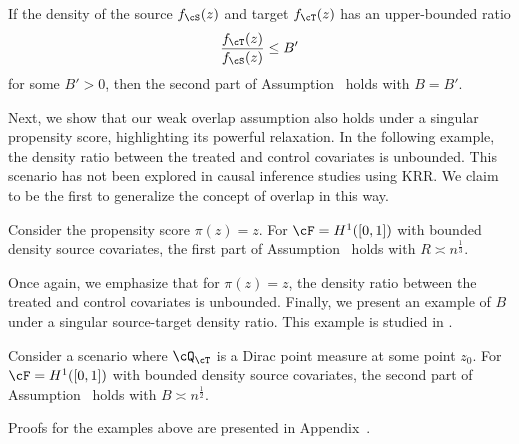 \documentclass[12pt,a4paper,pdftex,onepage]{article}
\begin{document}
\begin{example}
If the density of the source \(f_\cS(z)\) and target \(f_\cT(z)\) has an upper-bounded ratio
\[
\frac{f_\cT(z)}{f_\cS(z)} \leq B'
\]
for some \(B'>0\), then the second part of Assumption~ holds with \(B = B'\).
\end{example}

Next, we show that our weak overlap assumption also holds under a singular propensity score, highlighting its powerful relaxation. 
In the following example, the density ratio between the treated and control covariates is unbounded. 
This scenario has not been explored in causal inference studies using KRR. 
We claim to be the first to generalize the concept of overlap in this way.

\begin{example} \label{example; singular propensity 1}
Consider the propensity score \(\pi(z) = z\).
For \(\cF = H^1([0,1])\) with bounded density source covariates, the first part of Assumption~ holds with \(R \asymp n^{\frac{1}{3}}\).
\end{example}

Once again, we emphasize that for \(\pi(z)=z\), the density ratio between the treated and control covariates is unbounded. 
Finally, we present an example of \(B\) under a singular source-target density ratio. 
This example is studied in \citet{wang2023pseudo}.

\begin{example}\label{example; dirac target}
Consider a scenario where \(\cQ_\cT\) is a Dirac point measure at some point \(z_0\). 
For \(\cF = H^1([0,1])\) with bounded density source covariates, the second part of Assumption~ holds with \(B \asymp n^{\frac{1}{2}}\).
\end{example}

Proofs for the examples above are presented in Appendix~.
\end{document}

